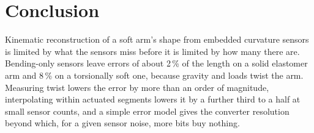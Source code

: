 \documentclass[conference]{IEEEtran}
\begin{document}
\section{Conclusion}

Kinematic reconstruction of a soft arm's shape from embedded curvature
sensors is limited by what the sensors miss before it is limited by how many
there are. Bending-only sensors leave errors of about 2\,\% of the length on
a solid elastomer arm and 8\,\% on a torsionally soft one, because gravity
and loads twist the arm. Measuring twist lowers the error by more than an
order of magnitude, interpolating within actuated segments lowers it by a
further third to a half at small sensor counts, and a simple error model gives
the converter resolution beyond which, for a given sensor noise, more bits
buy nothing.
\end{document}
